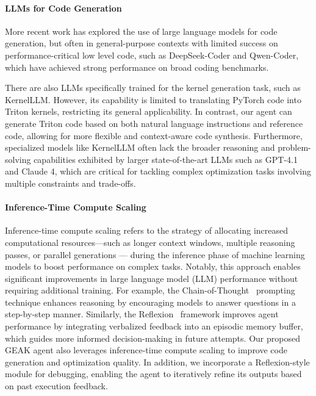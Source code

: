 \paragraph{LLMs for Code Generation}

More recent work has explored the use of large language models for code generation, but often in general-purpose contexts with limited success on performance-critical low level code, such as DeepSeek-Coder\cite{guo2024deepseekcoderlargelanguagemodel} and Qwen-Coder\cite{hui2024qwen25codertechnicalreport}, which have achieved strong performance on broad coding benchmarks.

There are also LLMs specifically trained for the kernel generation task, such as KernelLLM. However, its capability is limited to translating PyTorch code into Triton kernels, restricting its general applicability. In contrast, our agent can generate Triton code based on both natural language instructions and reference code, allowing for more flexible and context-aware code synthesis. Furthermore, specialized models like KernelLLM often lack the broader reasoning and problem-solving capabilities exhibited by larger state-of-the-art LLMs such as GPT-4.1 and Claude 4, which are critical for tackling complex optimization tasks involving multiple constraints and trade-offs.


\paragraph{Inference-Time Compute Scaling}
Inference-time compute scaling refers to the strategy of allocating increased computational resources—such as longer context windows, multiple reasoning passes, or parallel generations — during the inference phase of machine learning models to boost performance on complex tasks.
Notably, this approach enables significant improvements in large language model (LLM) performance without requiring additional training.
For example, the Chain-of-Thought~\cite{shinn2023reflexionlanguageagentsverbal} prompting technique enhances reasoning by encouraging models to answer questions in a step-by-step manner. Similarly, the Reflexion~\cite{shinn2023reflexionlanguageagentsverbal} framework improves agent performance by integrating verbalized feedback into an episodic memory buffer, which guides more informed decision-making in future attempts.
Our proposed GEAK agent also leverages inference-time compute scaling to improve code generation and optimization quality. In addition, we incorporate a Reflexion-style module for debugging, enabling the agent to iteratively refine its outputs based on past execution feedback.
